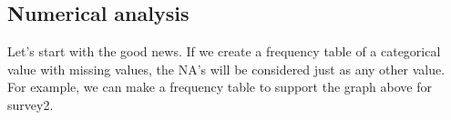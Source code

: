 \documentclass[]{tufte-book}
\newenvironment{Shaded}{}{}
\newcommand{\DataTypeTok}[1]{\textcolor[rgb]{0.56,0.13,0.00}{#1}}
\newcommand{\KeywordTok}[1]{\textcolor[rgb]{0.00,0.44,0.13}{\textbf{#1}}}
\newcommand{\NormalTok}[1]{#1}
\newcommand{\OperatorTok}[1]{\textcolor[rgb]{0.40,0.40,0.40}{#1}}
\newcommand{\StringTok}[1]{\textcolor[rgb]{0.25,0.44,0.63}{#1}}
\begin{document}
\hypertarget{numerical-analysis}{%
\subsection{Numerical analysis}\label{numerical-analysis}}

Let's start with the good news. If we create a frequency table of a categorical value with missing values, the NA's will be considered just as any other value. For example, we can make a frequency table to support the graph above for survey2.

\begin{Shaded}
\end{Shaded}
\end{document}
